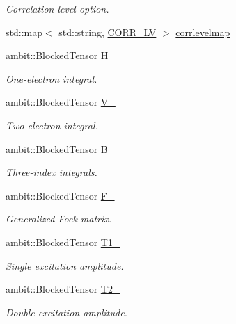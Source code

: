\begin{DoxyCompactItemize}
\begin{DoxyCompactList}\small\item\em Correlation level option. \end{DoxyCompactList}\item 
std\+::map$<$ std\+::string, \mbox{\hyperlink{classforte_1_1_m_r_d_s_r_g_a9219681e8d6714e73b1921325668c17a}{C\+O\+R\+R\+\_\+\+LV}} $>$ \mbox{\hyperlink{classforte_1_1_m_r_d_s_r_g_af22b004023bea9f184704265ea5df475}{corrlevelmap}}
\item 
ambit\+::\+Blocked\+Tensor \mbox{\hyperlink{classforte_1_1_m_r_d_s_r_g_a90c61ac19fe4eee5c6b65fbb78e4f4eb}{H\+\_\+}}
\begin{DoxyCompactList}\small\item\em One-\/electron integral. \end{DoxyCompactList}\item 
ambit\+::\+Blocked\+Tensor \mbox{\hyperlink{classforte_1_1_m_r_d_s_r_g_aefb9b6b4562764d1c2418ad401535917}{V\+\_\+}}
\begin{DoxyCompactList}\small\item\em Two-\/electron integral. \end{DoxyCompactList}\item 
ambit\+::\+Blocked\+Tensor \mbox{\hyperlink{classforte_1_1_m_r_d_s_r_g_a13f45c59bdc077eb348ab0f68079ed10}{B\+\_\+}}
\begin{DoxyCompactList}\small\item\em Three-\/index integrals. \end{DoxyCompactList}\item 
ambit\+::\+Blocked\+Tensor \mbox{\hyperlink{classforte_1_1_m_r_d_s_r_g_a729c8b299348eb39ee86c1800a8ca583}{F\+\_\+}}
\begin{DoxyCompactList}\small\item\em Generalized Fock matrix. \end{DoxyCompactList}\item 
ambit\+::\+Blocked\+Tensor \mbox{\hyperlink{classforte_1_1_m_r_d_s_r_g_a285cb0c55acb3ce15fb5c8194edb3387}{T1\+\_\+}}
\begin{DoxyCompactList}\small\item\em Single excitation amplitude. \end{DoxyCompactList}\item 
ambit\+::\+Blocked\+Tensor \mbox{\hyperlink{classforte_1_1_m_r_d_s_r_g_ab3f2072d2ce366839f74b4c298418b43}{T2\+\_\+}}
\begin{DoxyCompactList}\small\item\em Double excitation amplitude. \end{DoxyCompactList}\item 

\end{DoxyCompactItemize}
